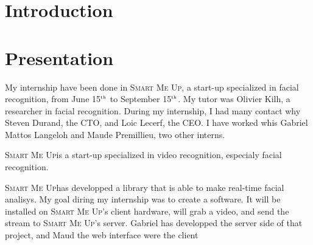\documentclass[a4paper,11pt]{custom}
\newcommand{\smu}{\textsc{Smart Me Up}}
\newcommand{\nth}[1]{#1$^{\text{\tiny th}}$}
\begin{document}



\chapter{Introduction}

\chapter{Presentation}

My internship have been done in \smu, a start-up specialized in facial
recognition, from June \nth{15} to September \nth{15}. My tutor was Olivier
Kilh, a researcher in facial recognition. During my internship, I had many
contact why Steven Durand, the CTO, and Loic Lecerf, the CEO. I have worked whis
Gabriel Mattos Langeloh and Maude Premillieu, two other interns.

\smu is a start-up specialized in video recognition, especialy facial
recognition.

\smu has developped a library that is able to make real-time facial analisys. My
goal diring my internship was to create a software. It will be installed on
\smu's client hardware, will grab a video, and send the stream to \smu's server.
Gabriel has developped the server side of that project, and Maud the web
interface were the client 
\end{document}
